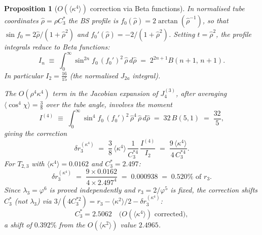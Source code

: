 \documentclass[11pt,a4paper]{article}
\newtheorem{proposition}[theorem]{Proposition}
\theoremstyle{definition}\newtheorem{definition}[theorem]{Definition}
\theoremstyle{remark}
\newcommand{\vp}{\varphi}
\newcommand{\lam}{\lambda}
\begin{document}
\begin{proposition}[$O(\langle\kappa^4\rangle)$ correction via Beta functions]
\label{P15:prop:kappa4}
In normalised tube coordinates $\hat\rho = \rho C_3^*$ the BS profile is
$f_0(\hat\rho)=2\arctan(\hat\rho^{-1})$, so that
$\sin f_0 = 2\hat\rho/(1+\hat\rho^2)$ and
$f_0'(\hat\rho)=-2/(1+\hat\rho^2)$.
Setting $t=\hat\rho^2$, the profile integrals reduce to Beta functions:
\begin{equation}
  I_n \;\equiv\;
  \int_0^\infty \sin^{2n}\!f_0\,(f_0')^2\,\hat\rho\,d\hat\rho
  \;=\; 2^{2n+1}B\!\left(n+1,\,n+1\right).
  \label{P15:eq:In_beta}
\end{equation}
In particular $I_2 = \tfrac{16}{15}$ (the normalised $J_{2a}$ integral).

The $O(\rho^4\kappa^4)$ term in the Jacobian expansion of $J_4^{(3)}$,
after averaging $\langle\cos^4\chi\rangle = \tfrac{3}{8}$ over the tube
angle, involves the moment
\begin{equation}
  I^{(4)} \;\equiv\;
  \int_0^\infty \sin^4\!f_0\,(f_0')^2\,\hat\rho^4\,\hat\rho\,d\hat\rho
  \;=\; 32\,B(5,1) \;=\; \frac{32}{5},
  \label{P15:eq:Ik4}
\end{equation}
giving the correction
\begin{equation}
  \delta r_3^{(\kappa^4)}
  \;=\; \frac{3}{8}\,\langle\kappa^4\rangle\,\frac{1}{C_3^{*4}}\,
        \frac{I^{(4)}}{I_2}
  \;=\; \frac{9\,\langle\kappa^4\rangle}{4\,C_3^{*4}}.
  \label{P15:eq:dr_kappa4}
\end{equation}
For $T_{2,3}$ with $\langle\kappa^4\rangle=0.0162$ and $C_3^*=2.497$:
\begin{equation}
  \delta r_3^{(\kappa^4)}
  \;=\; \frac{9\times0.0162}{4\times2.497^4}
  \;=\; 0.000938
  \;=\; 0.520\%\text{ of }r_3.
  \label{P15:eq:dr_kappa4_num}
\end{equation}
Since $\lam_3=\vp^6$ is proved independently and $r_3=2/\vp^5$ is fixed,
the correction shifts $C_3^*$ (not $\lam_3$) via
$3/(4C_3^{*2}) = r_3 - \langle\kappa^2\rangle/2 - \delta r_3^{(\kappa^4)}$:
\begin{equation}
  \boxed{C_3^* = 2.5062 \quad\bigl(O(\langle\kappa^4\rangle)\text{ corrected}\bigr),}
  \label{P15:eq:C3star_kappa4}
\end{equation}
a shift of $0.392\%$ from the $O(\langle\kappa^2\rangle)$ value $2.4965$.
\end{proposition}
\end{document}
